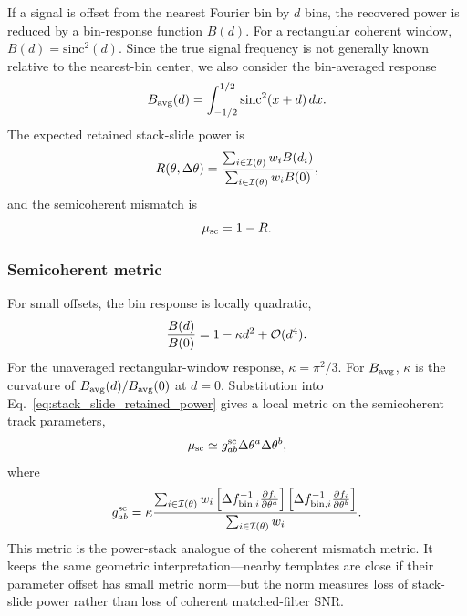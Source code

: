 If a signal is offset from the nearest Fourier bin by $d$ bins, the recovered
power is reduced by a bin-response function $B(d)$.  For a rectangular coherent
window, $B(d)=\mathrm{sinc}^2(d)$.  Since the true signal frequency is not
generally known relative to the nearest-bin center, we also consider the
bin-averaged response
\begin{equation}
    B_{\rm avg}(d)
    =
    \int_{-1/2}^{1/2}
    \mathrm{sinc}^2(x+d)\,dx .
    \label{eq:bin_averaged_response}
\end{equation}
The expected retained stack-slide power is
\begin{equation}
    R(\theta,\Delta\theta)
    =
    \frac{
        \sum_{i\in{\cal I}(\theta)}
        w_i B(d_i)
    }{
        \sum_{i\in{\cal I}(\theta)}
        w_i B(0)
    },
    \label{eq:stack_slide_retained_power}
\end{equation}
and the semicoherent mismatch is
\begin{equation}
    \mu_{\rm sc} = 1-R .
    \label{eq:semicoherent_mismatch}
\end{equation}

\subsubsection{Semicoherent metric}
\label{sec:semicoherent_metric}

For small offsets, the bin response is locally quadratic,
\begin{equation}
    \frac{B(d)}{B(0)}
    =
    1-\kappa d^2 + {\cal O}(d^4).
\end{equation}
For the unaveraged rectangular-window response, $\kappa=\pi^2/3$.  For
$B_{\rm avg}$, $\kappa$ is the curvature of
$B_{\rm avg}(d)/B_{\rm avg}(0)$ at $d=0$.  Substitution into
Eq.~\eqref{eq:stack_slide_retained_power} gives a local metric on the
semicoherent track parameters,
\begin{equation}
    \mu_{\rm sc}
    \simeq
    g^{\rm sc}_{ab}\Delta\theta^a\Delta\theta^b,
\end{equation}
where
\begin{equation}
    g^{\rm sc}_{ab}
    =
    \kappa
    \frac{
        \sum_{i\in{\cal I}(\theta)}
        w_i
        \left[
            \Delta f_{{\rm bin},i}^{-1}
            \frac{\partial f_i}{\partial\theta^a}
        \right]
        \left[
            \Delta f_{{\rm bin},i}^{-1}
            \frac{\partial f_i}{\partial\theta^b}
        \right]
    }{
        \sum_{i\in{\cal I}(\theta)} w_i
    } .
    \label{eq:semicoherent_metric_tensor}
\end{equation}
This metric is the power-stack analogue of the coherent mismatch metric.  It
keeps the same geometric interpretation---nearby templates are close if their
parameter offset has small metric norm---but the norm measures loss of
stack-slide power rather than loss of coherent matched-filter SNR.

